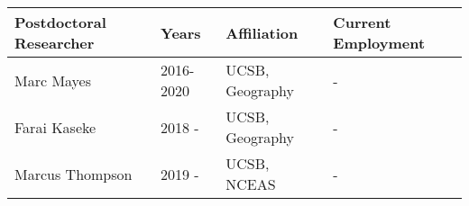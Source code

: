 
\begin{longtable}{lp{1.5cm} p{3.5cm}p{4.5cm}}
Postdoctoral Researcher & Years & Affiliation & Current Employment\\
\hline 
\endhead 
Marc Mayes & 2016-2020 & UCSB, Geography &  -   \\
Farai Kaseke & 2018 -  & UCSB, Geography &  -   \\
Marcus Thompson & 2019 -  & UCSB, NCEAS &  -   \\
\end{longtable}


